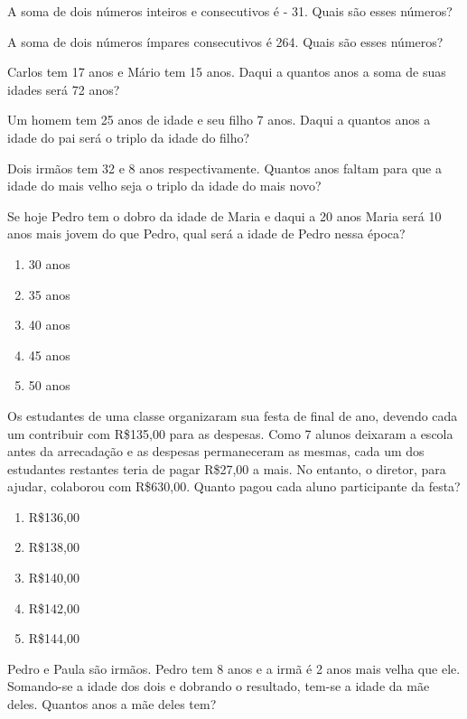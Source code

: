 				\item A soma de dois números inteiros e consecutivos é - 31. Quais são esses números?
				\item A soma de dois números ímpares consecutivos é 264. Quais são esses números?	
				\item Carlos tem 17 anos e Mário tem 15 anos. Daqui a quantos anos a soma de suas idades será 72 anos?
				\item Um homem tem 25 anos de idade e seu filho 7 anos. Daqui a quantos anos a idade do pai será o triplo da idade do filho?
				\item Dois irmãos tem 32 e 8 anos respectivamente. Quantos anos faltam para que a idade do mais velho seja o triplo da idade do mais novo?
				\item Se hoje Pedro tem o dobro da idade de Maria e daqui a 20 anos Maria será 10 anos mais jovem do que Pedro, qual será a idade de Pedro nessa época?
					\begin{multicols}{5}
					\begin{enumerate}
						\item 30 anos
						\item 35 anos
						\item 40 anos  
						\item 45 anos
						\item 50 anos
					\end{enumerate}
					\end{multicols}
				\item Os estudantes de uma classe organizaram sua festa de final de ano, devendo cada um contribuir com R\$135,00 para as despesas. Como 7 alunos deixaram a escola antes da arrecadação e as despesas permaneceram as mesmas, cada um dos estudantes restantes teria de pagar R\$27,00 a mais. No entanto, o diretor, para ajudar, colaborou com R\$630,00. Quanto pagou cada aluno participante da festa?
					\begin{multicols}{5}					
					\begin{enumerate}					
						\item R\$136,00
						\item R\$138,00
						\item R\$140,00
						\item R\$142,00
						\item R\$144,00
					\end{enumerate}
					\end{multicols}
				\item Pedro e Paula são irmãos. Pedro tem 8 anos e a irmã é 2 anos mais velha que ele. Somando-se a idade dos dois e dobrando o resultado, tem-se a idade da mãe deles. Quantos anos a mãe deles tem?
